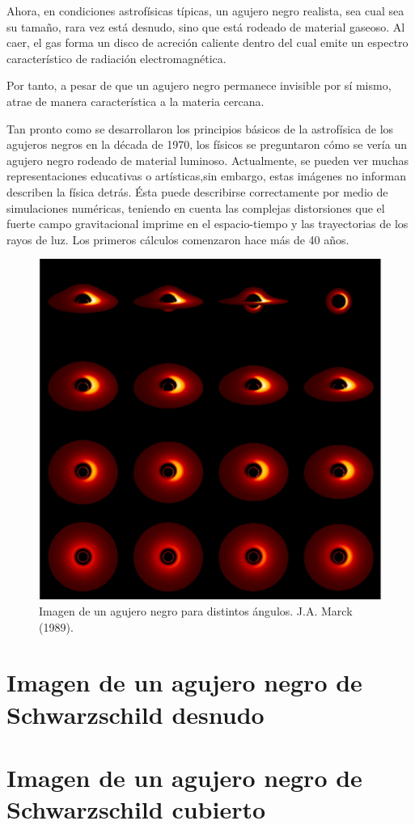\documentclass[10pt]{article}
\begin{document}
Ahora, en condiciones astrofísicas típicas, un agujero negro realista, sea cual sea su tamaño, rara vez está desnudo, sino que está rodeado de material gaseoso. Al caer, el gas forma un disco de acreción caliente dentro del cual emite un espectro característico de radiación electromagnética.

Por tanto, a pesar de que un agujero negro permanece invisible por sí mismo, atrae de manera característica a la materia cercana.

Tan pronto como se desarrollaron los principios básicos de la astrofísica de los agujeros negros en la década de 1970, los físicos se preguntaron cómo se vería un agujero negro rodeado de material luminoso. Actualmente, se pueden ver muchas representaciones educativas o artísticas,sin embargo, estas imágenes no informan describen la física detrás. Ésta puede describirse correctamente por medio de simulaciones numéricas, teniendo en cuenta las complejas distorsiones que el fuerte campo gravitacional imprime en el espacio-tiempo y las trayectorias de los rayos de luz. Los primeros cálculos comenzaron hace más de 40 años.


\begin{figure}[H]
\centering
\includegraphics[width=0.5\linewidth]{Images/marck_1989}
\caption{Imagen de un agujero negro para distintos ángulos. J.A. Marck (1989).}
\label{fig:marck1989}
\end{figure}

\section{Imagen de un agujero negro de Schwarzschild desnudo}

\section{Imagen de un agujero negro de Schwarzschild cubierto}

\printbibliography[title=REFERENCIAS]
		
	
\end{document}
